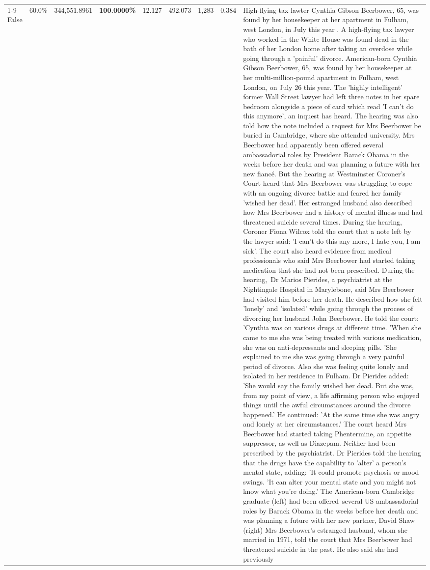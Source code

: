 \begin{table}[H]
\begin{tabular}{lllrlllll}
\cline{1-9}
False & 60.0\% & 344,551.8961 & \bfseries \color{red} 100.0000\% & 12.127 & 492.073 & 1,283 & 0.384 & High-flying tax lawter Cynthia Gibson Beerbower, 65, was found by her housekeeper at her apartment in Fulham, west London, in July this year . A high-flying tax lawyer who worked in the White House was found dead in the bath of her London home after taking an overdose while going through a 'painful' divorce. American-born Cynthia Gibson Beerbower, 65, was found by her housekeeper at her multi-million-pound apartment in Fulham, west London, on July 26 this year. The 'highly intelligent' former Wall Street lawyer had left three notes in her spare bedroom alongside a piece of card which read 'I can't do this anymore', an inquest has heard. The hearing was also told how the note included a request for Mrs Beerbower be buried in Cambridge, where she attended university. Mrs Beerbower had apparently been offered several ambassadorial roles by President Barack Obama in the weeks before her death and was planning a future with her new fiancé. But the hearing at Westminster Coroner's Court heard that Mrs Beerbower was struggling to cope with an ongoing divorce battle and feared her family 'wished her dead'. Her estranged husband also described how Mrs Beerbower had a history of mental illness and had threatened suicide several times. During the hearing, Coroner Fiona Wilcox told the court that a note left by the lawyer said: 'I can't do this any more, I hate you, I am sick'. The court also heard evidence from medical professionals who said Mrs Beerbower had started taking medication that she had not been prescribed. During the hearing, Dr Marios Pierides, a psychiatrist at the Nightingale Hospital in Marylebone, said Mrs Beerbower had visited him before her death. He described how she felt 'lonely' and 'isolated' while going through the process of divorcing her husband John Beerbower. He told the court: 'Cynthia was on various drugs at different time. 'When she came to me she was being treated with various medication, she was on anti-depressants and sleeping pills. 'She explained to me she was going through a very painful period of divorce. Also she was feeling quite lonely and isolated in her residence in Fulham. Dr Pierides added: 'She would say the family wished her dead. But she was, from my point of view, a life affirming person who enjoyed things until the awful circumstances around the divorce happened.' He continued: 'At the same time she was angry and lonely at her circumstances.' The court heard Mrs Beerbower had started taking Phentermine, an appetite suppressor, as well as Diazepam. Neither had been prescribed by the psychiatrist. Dr Pierides told the hearing that the drugs have the capability to 'alter' a person's mental state, adding: 'It could promote psychosis or mood swings. 'It can alter your mental state and you might not know what you're doing.' The American-born Cambridge graduate (left) had been offered several US ambassadorial roles by Barack Obama in the weeks before her death and was planning a future with her new partner, David Shaw (right) Mrs Beerbower's estranged husband, whom she married in 1971, told the court that Mrs Beerbower had threatened suicide in the past. He also said she had previously 
\end{tabular}
\end{table}
